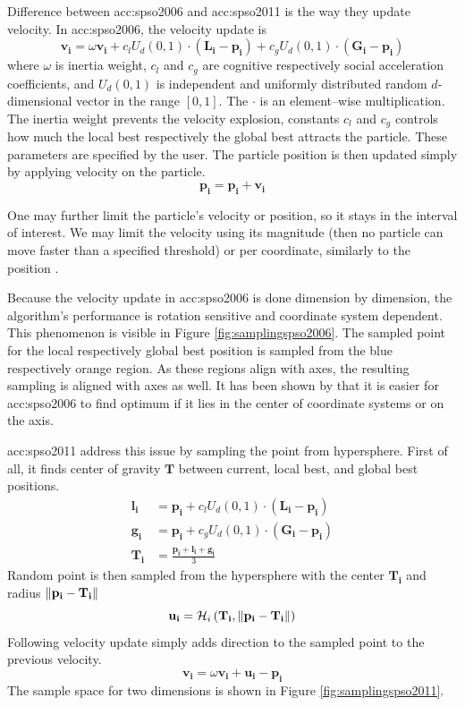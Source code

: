 Difference between \acrshort{acc:spso2006} and \acrshort{acc:spso2011} is the way they update velocity. In \acrshort{acc:spso2006}, the velocity update is
$$
\mathbf{v_i} = \omega\mathbf{v_i} 
+ c_l U_d\left( 0,1 \right) \cdot \left( \mathbf{L_i} - \mathbf{p_i} \right)
+ c_g U_d\left( 0,1 \right) \cdot \left( \mathbf{G_i} - \mathbf{p_i} \right)
$$ 
where $\omega$ is inertia weight, $c_l$ and $c_g$ are cognitive respectively social acceleration coefficients, and $U_d(0,1)$ is independent and uniformly distributed random $d$-dimensional vector in the range $\left[ 0,1 \right]$. The $\cdot$ is an element--wise multiplication. The inertia weight prevents the velocity explosion, constants $c_l$ and $c_g$ controls how much the local best respectively the global best attracts the particle. These parameters are specified by the user. The particle position is then updated simply by applying velocity on the particle.
$$
\mathbf{p_i} = \mathbf{p_i} + \mathbf{v_i}
$$

One may further limit the particle's velocity or position, so it stays in the interval of interest. We may limit the velocity using its magnitude (then no particle can move faster than a specified threshold) or per coordinate, similarly to the position \citep{PSOvelocitylimit}.

Because the velocity update in \acrshort{acc:spso2006} is done dimension by dimension, the algorithm's performance is rotation sensitive and coordinate system dependent. This phenomenon is visible in Figure \ref{fig:samplingspso2006}. The sampled point for the local respectively global best position is sampled from the blue respectively orange region. As these regions align with axes, the resulting sampling is aligned with axes as well. It has been shown by \citet{psobiasinzero} that it is easier for \acrshort{acc:spso2006} to find optimum if it lies in the center of coordinate systems or on the axis.

\acrshort{acc:spso2011} address this issue by sampling the point from hypersphere. First of all, it finds center of gravity $\mathbf{T}$ between current, local best, and global best positions.
\begin{align*}
    \mathbf{l_i} &= \mathbf{p_i} + c_l U_d\left( 0,1 \right) \cdot \left( \mathbf{L_i} - \mathbf{p_i} \right) \\
    \mathbf{g_i} &= \mathbf{p_i} + c_g U_d\left( 0,1 \right) \cdot \left( \mathbf{G_i} - \mathbf{p_i} \right) \\
    \mathbf{T_i} &= \frac{\mathbf{p_i}+\mathbf{l_i}+\mathbf{g_i}}{3}
\end{align*}
Random point is then sampled from the hypersphere with the center $\mathbf{T_i}$ and radius $\left\lVert\mathbf{p_i} - \mathbf{T_i}\right\rVert$
$$
\mathbf{u_i} = \mathcal{H}_i\left(\mathbf{T_i}, \left\lVert\mathbf{p_i} - \mathbf{T_i}\right\rVert\right)
$$
Following velocity update simply adds direction to the sampled point to the previous velocity.
$$
\mathbf{v_i} = \omega\mathbf{v_i}+\mathbf{u_i}-\mathbf{p_i}
$$
The sample space for two dimensions is shown in Figure \ref{fig:samplingspso2011}.
